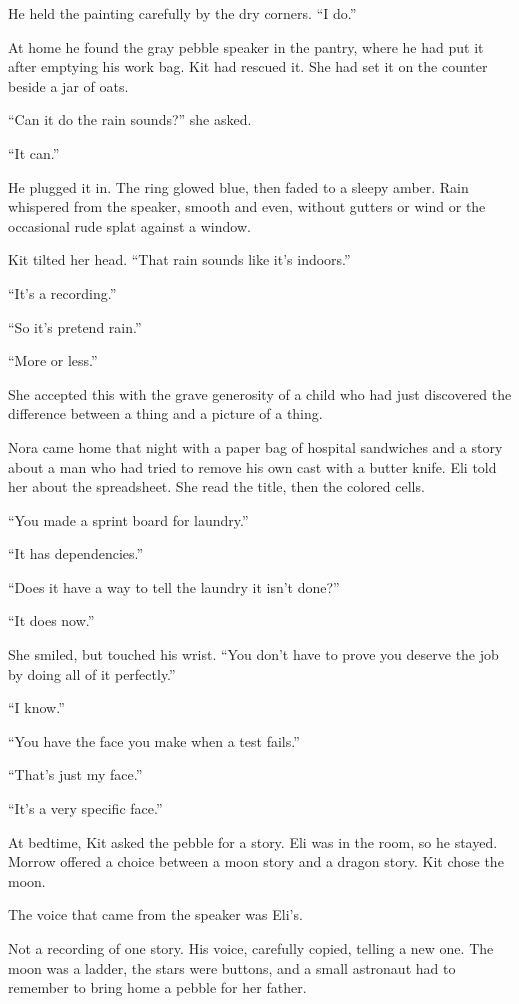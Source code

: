 \documentclass[11pt,openany]{book}
\begin{document}
He held the painting carefully by the dry corners. ``I do.''

At home he found the gray pebble speaker in the pantry, where he had put it after emptying his work bag. Kit had rescued it. She had set it on the counter beside a jar of oats.

``Can it do the rain sounds?'' she asked.

``It can.''

He plugged it in. The ring glowed blue, then faded to a sleepy amber. Rain whispered from the speaker, smooth and even, without gutters or wind or the occasional rude splat against a window.

Kit tilted her head. ``That rain sounds like it's indoors.''

``It's a recording.''

``So it's pretend rain.''

``More or less.''

She accepted this with the grave generosity of a child who had just discovered the difference between a thing and a picture of a thing.

Nora came home that night with a paper bag of hospital sandwiches and a story about a man who had tried to remove his own cast with a butter knife. Eli told her about the spreadsheet. She read the title, then the colored cells.

``You made a sprint board for laundry.''

``It has dependencies.''

``Does it have a way to tell the laundry it isn't done?''

``It does now.''

She smiled, but touched his wrist. ``You don't have to prove you deserve the job by doing all of it perfectly.''

``I know.''

``You have the face you make when a test fails.''

``That's just my face.''

``It's a very specific face.''

At bedtime, Kit asked the pebble for a story. Eli was in the room, so he stayed. Morrow offered a choice between a moon story and a dragon story. Kit chose the moon.

The voice that came from the speaker was Eli's.

Not a recording of one story. His voice, carefully copied, telling a new one. The moon was a ladder, the stars were buttons, and a small astronaut had to remember to bring home a pebble for her father.
\end{document}
